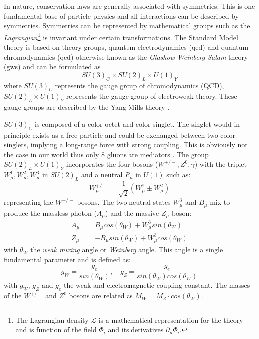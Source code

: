 In nature, conservation laws are generally associated with symmetries. This is one fundamental base of particle physics and all interactions can be described by symmetries. Symmetries can be represented by mathematical groups such as the \textit{Lagrangian}\footnote{The Lagrangian density $\mathcal{L}$ is a mathematical representation for the theory and is function of the field $\Phi_i$ and its derivatives $\partial_{\mu}\Phi_i$.} is invariant under certain transformations. The Standard Model theory is based on theory groups, quantum electrodynamics (\acrshort{qed}) and quantum chromodynamics (\acrshort{qcd}) otherwise known as the \textit{Glashow-Weinberg-Salam} theory (\acrshort{gws}) and can be formulated as
\begin{equation}
  SU(3)_{C} \times SU(2)_{L} \times U(1)_{Y}
\end{equation}
where $SU(3)_{C}$ represents the gauge group of chromodynamics (QCD), $SU(2)_{L} \times U(1)_{Y}$ represents the gauge group of electroweak theory. These gauge groups are described by the Yang-Mills theory \cite{Yang:1954ek}.

$SU(3)_{C}$ is composed of a color octet and color singlet. The singlet would in principle exists as a free particle and could be exchanged between two color singlets, implying a long-range force with strong coupling. This is obviously not the case in our world thus only 8 gluons are mediators \cite{Griffiths:343277}. The group $SU(2)_{L} \times U(1)_{Y}$ incorporates the four bosons ($W^{+/-}, Z^0, \gamma$) with the triplet $W_{\mu}^1, W_{\mu}^2, W_{\mu}^3$ in $SU(2)_{L}$ and a neutral $B_{\mu}$ in $U(1)$ such as:
\begin{equation}
  W_{\mu}^{+/-} = \frac{1}{\sqrt{2}}(W_{\mu}^1 \pm W_{\mu}^2)
\end{equation}
representing the $W^{+/-}$ bosons. The two neutral states $W_{\mu}^3$ and $B_{\mu}$ mix to produce the massless photon ($A_{\mu}$) and the massive $Z_{\mu}$ boson:
\begin{equation}
  \begin{aligned}
    A_{\mu} &= B_{\mu} cos(\theta_W) + W_{\mu}^3 sin(\theta_W)\\
    Z_{\mu} &= - B_{\mu} sin(\theta_W) + W_{\mu}^3 cos(\theta_W)
  \end{aligned}
\end{equation}
with $\theta_W$ the \textit{weak mixing} angle or \textit{Weinberg} angle. This angle is a single fundamental parameter and is defined as:
\begin{equation}
  g_W = \frac{g_e}{sin(\theta_W)}, \quad g_Z = \frac{g_e}{sin(\theta_W) cos(\theta_W)}
\end{equation}
with $g_W$, $g_Z$ and $g_e$ the weak and electromagnetic coupling constant. The masses of the $W^{+/-}$ and $Z^0$ bosons are related as $M_W = M_Z \cdot cos(\theta_W)$.

